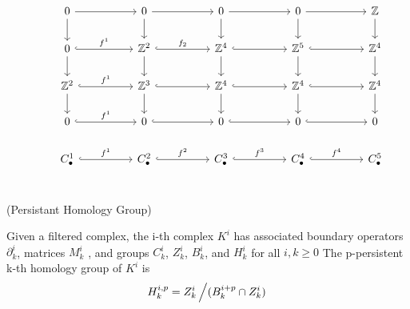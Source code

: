 \documentclass[11pt,a4paper]{report}
\begin{document}
              \[
                \begin{tikzcd}[ampersand replacement=\&]
                  \& 0 \arrow[rr] \arrow[d]                      \&\& 0 \arrow[rr] \arrow[d]                                \&\& 0 \arrow[rr] \arrow[d]                            \&\& 0 \arrow[rr] \arrow[d]                            \&\& \mathbb{Z} \arrow[d]\\
                  \& 0 \arrow[hookrightarrow]{rr}{f^1} \arrow[d] \&\& \mathbb{Z}^2 \arrow[hookrightarrow]{rr}{f_2} \arrow[d] \&\& \mathbb{Z}^4 \arrow[hookrightarrow]{rr} \arrow[d] \&\& \mathbb{Z}^5 \arrow[d] \arrow[hookrightarrow]{rr} \&\& \mathbb{Z}^4 \arrow[d]\\
                  \& \mathbb{Z}^2 \arrow[hookrightarrow]{rr}{f^1} \arrow[d] \&\& \mathbb{Z}^3 \arrow[hookrightarrow]{rr} \arrow[d] \&\& \mathbb{Z}^4 \arrow[hookrightarrow]{rr} \arrow[d] \&\& \mathbb{Z}^4 \arrow[d] \arrow[hookrightarrow]{rr} \&\& \mathbb{Z}^4 \arrow[d]\\
                  \& 0 \arrow[hookrightarrow]{rr}{f^1}           \&\& 0 \arrow[hookrightarrow]{rr}         \&\& 0 \arrow[hookrightarrow]{rr}          \&\& 0 \arrow[hookrightarrow]{rr} \&\& 0 \\
                  \& C_\bullet^1 \arrow[hookrightarrow]{rr}{f^1}       \&\& C_\bullet^2 \arrow[hookrightarrow]{rr}{f^2} \&\& C_\bullet^3 \arrow[hookrightarrow]{rr}{f^3} \&\& C_\bullet^4 \arrow[hookrightarrow]{rr}{f^4} \&\& C_\bullet^5 \\
                \end{tikzcd}
              \]
              \begin{defn} (Persistant Homology Group)
 
                Given a filtered complex, the i-th complex $K^i$ has associated boundary operators 
                $\partial^i_k$, matrices $M^i_k$ , and groups $C^i_k$, $Z^i_k$, $B^i_k$, and $H^i_k$ for all $i, k \geq 0$
                The p-persistent k-th homology group of $K^i$ is 
                        \[
                        H_k^{i, p} = Z_k^i \left/ (B_k^{i+p} \cap Z_k^i) \right.
            \]
            \end{defn}
              
\end{document}
